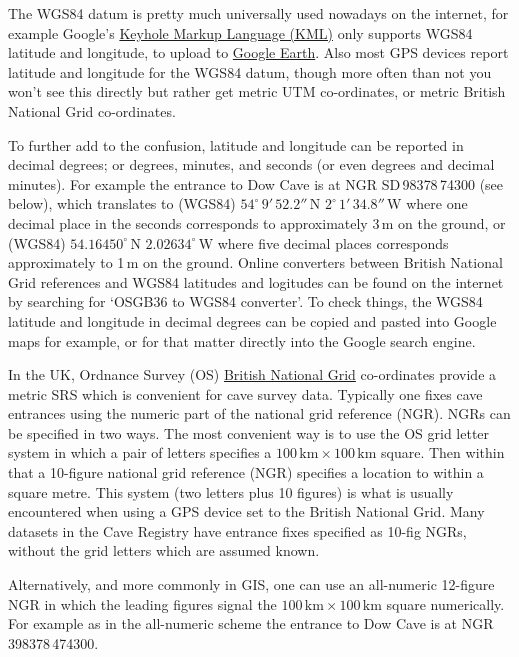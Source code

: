 \documentclass[]{article}
\begin{document}
The WGS84 datum is pretty much universally used nowadays on the internet,
for example Google's
\href{https://developers.google.com/kml/}{Keyhole Markup Language (KML)}
only supports WGS84 latitude and longitude, to upload to
\href{https://en.wikipedia.org/wiki/Google_Earth}{Google Earth}.
Also most GPS devices report latitude and longitude for the WGS84
datum, though more often than not you won't see this directly but
rather get metric UTM co-ordinates, or metric British National Grid
co-ordinates.

To further add to the confusion, latitude and longitude can be reported
in decimal degrees; or degrees, minutes, and seconds (or even degrees
and decimal minutes). For example the entrance to Dow Cave is at NGR
SD\,983{\small78}\,743{\small00} (see below), which translates to (WGS84)
$54^\circ\,9'\,52.2''$\,N
$2^\circ\,1'\,34.8''$\,W where one decimal place in the
seconds corresponds to approximately 3\,m on the ground, or (WGS84)
$54.16450^\circ$\,N $2.02634^\circ$\,W where five decimal places
corresponds approximately to 1\,m on the ground. Online converters
between British National Grid references and WGS84 latitudes and
logitudes can be found on the internet by searching for `OSGB36 to WGS84
converter'. To check things, the WGS84 latitude and longitude in decimal
degrees can be copied and pasted into Google maps for example, or for
that matter directly into the Google search engine.

In the UK, Ordnance Survey (OS)
\href{https://en.wikipedia.org/wiki/Ordnance_Survey_National_Grid}{British
National Grid} co-ordinates provide a metric SRS which is convenient for
cave survey data. Typically one fixes cave entrances using the numeric
part of the national grid reference (NGR). NGRs can be specified in two
ways. The most convenient way is to use the OS grid letter system in
which a pair of letters specifies a
$100\,\mathrm{km}\times100\,\mathrm{km}$ square. Then within
that a 10-figure national grid reference (NGR) specifies a location to
within a square metre. This system (two letters plus 10 figures) is what
is usually encountered when using a GPS device set to the British
National Grid. Many datasets in the Cave Registry have entrance fixes
specified as 10-fig NGRs, without the grid letters which are assumed
known.

Alternatively, and more commonly in GIS, one can use an all-numeric
12-figure NGR in which the leading figures signal the
$100\,\mathrm{km}\times100\,\mathrm{km}$ 
square numerically. For example as in the all-numeric scheme the
entrance to Dow Cave is at NGR\,{\small3}983{\small78}\,{\small4}743{\small00}.
\end{document}
